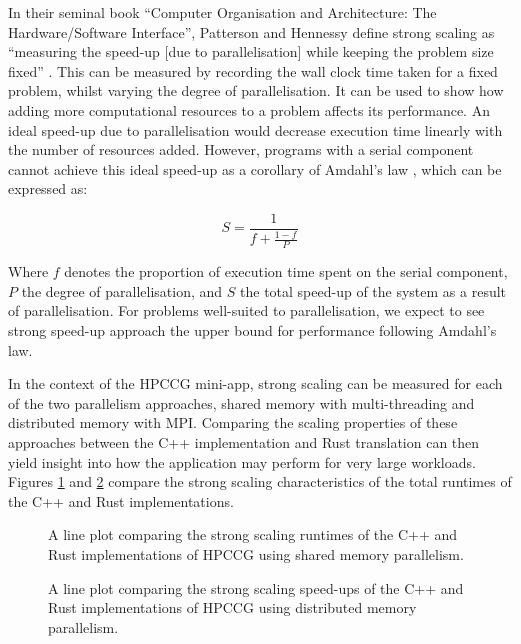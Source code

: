 In their seminal book ``Computer Organisation and Architecture: The Hardware/Software Interface'', Patterson and Hennessy define strong scaling as ``measuring the speed-up [due to parallelisation] while keeping the problem size fixed'' \cite{pattersonHennessyComputerOrganisationArchitecture}. This can be measured by recording the wall clock time taken for a fixed problem, whilst varying the degree of parallelisation. It can be used to show how adding more computational resources to a problem affects its performance. An ideal speed-up due to parallelisation would decrease execution time linearly with the number of resources added. However, programs with a serial component cannot achieve this ideal speed-up as a corollary of Amdahl's law \cite{amdahlsLaw}, which can be expressed as:

\begin{equation}
    S = \frac{1}{f + \frac{1-f}{P}}
\end{equation}

Where $f$ denotes the proportion of execution time spent on the serial component, $P$ the degree of parallelisation, and $S$ the total speed-up of the system as a result of parallelisation. For problems well-suited to parallelisation, we expect to see strong speed-up approach the upper bound for performance following Amdahl's law.

In the context of the HPCCG mini-app, strong scaling can be measured for each of the two parallelism approaches, shared memory with multi-threading and distributed memory with MPI. Comparing the scaling properties of these approaches between the C++ implementation and Rust translation can then yield insight into how the application may perform for very large workloads. Figures \ref{fig:strong_scaling_threaded} and \ref{fig:strong_scaling_mpi} compare the strong scaling characteristics of the total runtimes of the C++ and Rust implementations.

\begin{figure}[H]
    \centering
    
    \caption{A line plot comparing the strong scaling runtimes of the C++ and Rust implementations of HPCCG using shared memory parallelism.}
    \label{fig:strong_scaling_threaded}
\end{figure}

\begin{figure}[H]
    \centering
    
    \caption{A line plot comparing the strong scaling speed-ups of the C++ and Rust implementations of HPCCG using distributed memory parallelism.}
    \label{fig:strong_scaling_mpi}
\end{figure}

